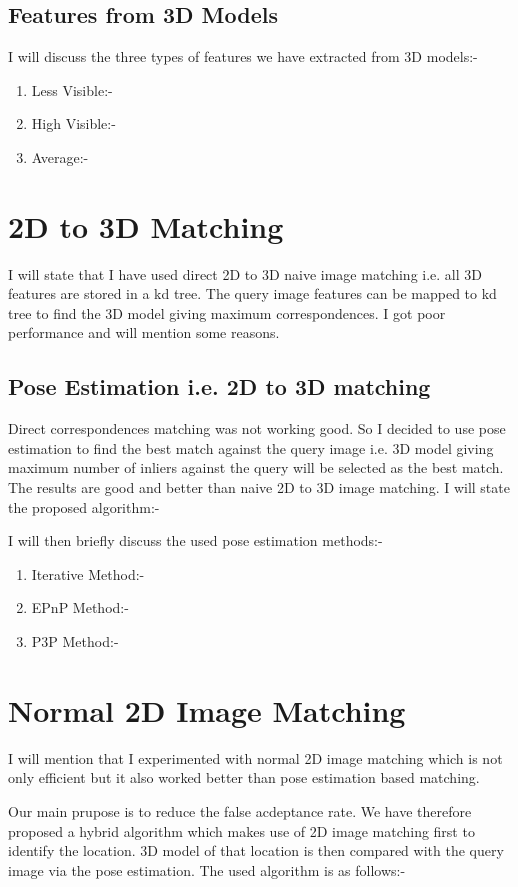 \subsection{ Features from 3D Models}
I will discuss the three types of 
features we have extracted from 3D models:-

\begin{enumerate}
\item Less Visible:-
\item High Visible:-
\item Average:-
\end{enumerate}

\section{2D to 3D Matching}
I will state that I have used direct 2D to 3D naive image 
matching i.e. all 3D features are stored in a kd tree.
The query image features can be mapped to kd tree 
to find the 3D model giving maximum correspondences.
I got poor performance and will mention some reasons.


\subsection{Pose Estimation i.e. 2D to 3D matching}
Direct correspondences matching 
was not working good. So I decided to use pose estimation 
to find the best match against the query image i.e. 
3D model giving maximum number 
of inliers against the query will be selected as the best match. The 
results are good and better than naive 2D to 3D image 
matching. I will state the proposed algorithm:-

I will then briefly discuss the used pose estimation methods:-
\begin{enumerate}
\item Iterative Method:-
\item EPnP Method:-
\item P3P Method:-
\end{enumerate}


\section{Normal 2D Image Matching}
I will mention that I experimented with normal 
2D image matching which is not only efficient 
but it also worked better than 
pose estimation based matching. 


Our main prupose is to reduce the false 
acdeptance rate. 
We have therefore proposed a hybrid algorithm 
which makes use of 2D image matching first to identify 
the location. 3D model of that location is then compared with the query
image via the pose estimation. The used algorithm is as follows:- 


